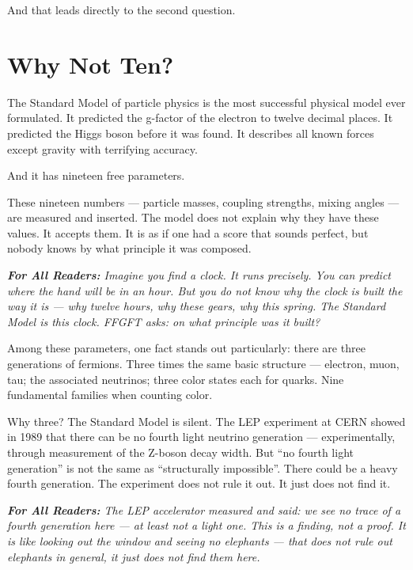 \documentclass[11pt,oneside]{book}
\newenvironment{laierspur}{%
  \par\vspace{4pt}%
  \noindent\small\itshape\color{blue!60!black}%
  \textbf{For All Readers:}\enspace\ignorespaces}{%
  \par\vspace{4pt}\normalsize\normalfont\normalcolor}
\begin{document}
And that leads directly to the second question.


\chapter{Why Not Ten?}

The Standard Model of particle physics is the most successful physical
model ever formulated. It predicted the g-factor of the electron to twelve
decimal places. It predicted the Higgs boson before it was found. It
describes all known forces except gravity with terrifying accuracy.

And it has nineteen free parameters.

These nineteen numbers — particle masses, coupling strengths, mixing angles —
are measured and inserted. The model does not explain why they have these
values. It accepts them. It is as if one had a score that sounds perfect,
but nobody knows by what principle it was composed.

\begin{laierspur}
Imagine you find a clock. It runs precisely. You can predict where the
hand will be in an hour. But you do not know why the clock is built the way
it is — why twelve hours, why these gears, why this spring. The Standard
Model is this clock. FFGFT asks: on what principle was it built?
\end{laierspur}

Among these parameters, one fact stands out particularly: there are three
generations of fermions. Three times the same basic structure — electron,
muon, tau; the associated neutrinos; three color states each for quarks.
Nine fundamental families when counting color.

Why three? The Standard Model is silent. The LEP experiment at CERN showed
in 1989 that there can be no fourth light neutrino generation —
experimentally, through measurement of the Z-boson decay width. But \enquote{no
fourth light generation} is not the same as \enquote{structurally impossible}. There
could be a heavy fourth generation. The experiment does not rule it out. It
just does not find it.

\begin{laierspur}
The LEP accelerator measured and said: we see no trace of a fourth
generation here — at least not a light one. This is a finding, not a proof.
It is like looking out the window and seeing no elephants — that does not
rule out elephants in general, it just does not find them here.
\end{laierspur}
\end{document}
